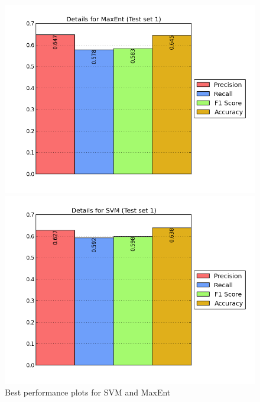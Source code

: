 \begin{figure}[htb]
	\centering
	\begin{minipage}{.45\linewidth}
		\includegraphics[width=\linewidth]{../img/plots/analysis/maxent_stats_best.png}
	\end{minipage}
	\hspace{0.05\linewidth}
	\begin{minipage}{.45\linewidth}
		\includegraphics[width=\linewidth]{../img/plots/analysis/svm_stats_best.png}
	\end{minipage}
	\label{fig:best_result}
	\caption[Best performance plots for SVM and MaxEnt]{Best performance plots for SVM and MaxEnt}
\end{figure}

